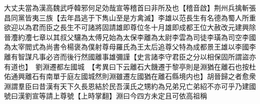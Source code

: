 大丈夫當為漢高魏武呼韓邪何足効哉宣等稽首曰非所及也【稽音啟】荆州兵擒斬張昌同黨皆夷三族【去年昌逃于下雋山至是方禽滅】李雄以范長生有名德為蜀人所重欲迎以為君而臣之長生不可諸將固請雄即尊位冬十月雄即成都王位大赦改元建興除晉灋約灋七章以其叔父驤為太傅兄始為太保李離為太尉李雲為司徒李璜為司空李國為太宰閻式為尚書令楊褒為僕射尊母羅氏為王太后追尊父特為成都景王雄以李國李離有智謀凡事必咨而後行然國離事雄彌謹【史言諸李守君臣之分以相保固所謂盜亦有道也】　劉淵遷都左國城　【考異曰下云離石大饑遷于黎亭則是淵猶在離石也按杜佑通興離石有南單于庭左國城然則淵雖遷左國猶在離石縣境内也】胡晉歸之者愈衆淵謂羣臣曰昔漢有天下久長恩結於民吾漢氏之甥約為兄弟兄亡弟紹不亦可乎乃建國號曰漢劉宣等請上尊號【上時掌翻】淵曰今四方未定且可依高祖稱